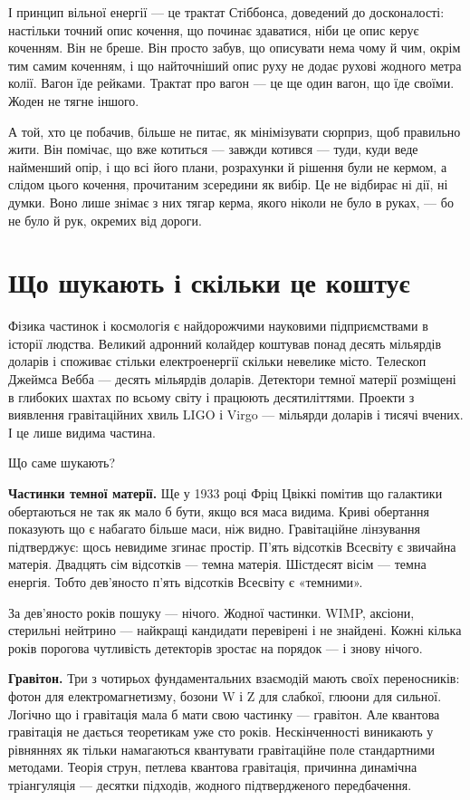 \documentclass[12pt, a4paper, openany]{book}
\begin{document}
І принцип вільної енергії --- це трактат Стіббонса, доведений до досконалості: настільки точний опис кочення, що починає здаватися, ніби це опис керує коченням. Він не бреше. Він просто забув, що описувати нема чому й чим, окрім тим самим коченням, і що найточніший опис руху не додає рухові жодного метра колії. Вагон їде рейками. Трактат про вагон --- це ще один вагон, що їде своїми. Жоден не тягне іншого.

А той, хто це побачив, більше не питає, як мінімізувати сюрприз, щоб правильно жити. Він помічає, що вже котиться --- завжди котився --- туди, куди веде найменший опір, і що всі його плани, розрахунки й рішення були не кермом, а слідом цього кочення, прочитаним зсередини як вибір. Це не відбирає ні дії, ні думки. Воно лише знімає з них тягар керма, якого ніколи не було в руках, --- бо не було й рук, окремих від дороги.


\chapter{Що шукають і скільки це коштує}

Фізика частинок і космологія є найдорожчими науковими підприємствами в історії людства. Великий адронний колайдер коштував понад десять мільярдів доларів і споживає стільки електроенергії скільки невелике місто. Телескоп Джеймса Вебба — десять мільярдів доларів. Детектори темної матерії розміщені в глибоких шахтах по всьому світу і працюють десятиліттями. Проекти з виявлення гравітаційних хвиль LIGO і Virgo — мільярди доларів і тисячі вчених. І це лише видима частина.

Що саме шукають?

\textbf{Частинки темної матерії.} Ще у 1933 році Фріц Цвіккі помітив що галактики обертаються не так як мало б бути, якщо вся маса видима. Криві обертання показують що є набагато більше маси, ніж видно. Гравітаційне лінзування підтверджує: щось невидиме згинає простір. П'ять відсотків Всесвіту є звичайна матерія. Двадцять сім відсотків — темна матерія. Шістдесят вісім — темна енергія. Тобто дев'яносто п'ять відсотків Всесвіту є «темними».

За дев'яносто років пошуку — нічого. Жодної частинки. WIMP, аксіони, стерильні нейтрино — найкращі кандидати перевірені і не знайдені. Кожні кілька років порогова чутливість детекторів зростає на порядок — і знову нічого.

\textbf{Гравітон.} Три з чотирьох фундаментальних взаємодій мають своїх переносників: фотон для електромагнетизму, бозони W і Z для слабкої, глюони для сильної. Логічно що і гравітація мала б мати свою частинку — гравітон. Але квантова гравітація не дається теоретикам уже сто років. Нескінченності виникають у рівняннях як тільки намагаються квантувати гравітаційне поле стандартними методами. Теорія струн, петлева квантова гравітація, причинна динамічна тріангуляція — десятки підходів, жодного підтвердженого передбачення.
\end{document}
